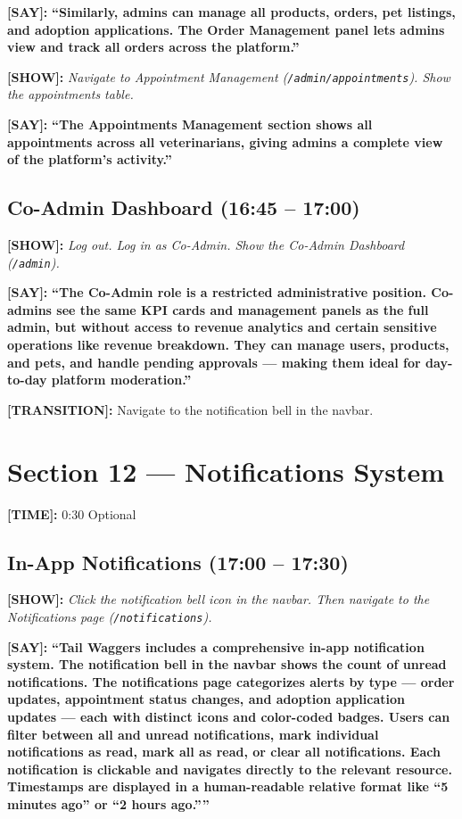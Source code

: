 \documentclass[12pt,a4paper]{article}
\newcommand{\say}[1]{\textbf{\textcolor{narration}{[SAY]:}} \textbf{``#1''}}
\newcommand{\show}[1]{\textbf{\textcolor{screen}{[SHOW]:}} \textit{#1}}
\newcommand{\timing}[1]{\textbf{\textcolor{timing}{[TIME]:}} #1}
\newcommand{\trans}[1]{\textbf{\textcolor{transition}{[TRANSITION]:}} #1}
\begin{document}
\say{Similarly, admins can manage all products, orders, pet listings, and adoption applications. The Order Management panel lets admins view and track all orders across the platform.}

\show{Navigate to Appointment Management (\texttt{/admin/appointments}). Show the appointments table.}

\say{The Appointments Management section shows all appointments across all veterinarians, giving admins a complete view of the platform's activity.}

\subsection{Co-Admin Dashboard (16:45 -- 17:00)}

\show{Log out. Log in as Co-Admin. Show the Co-Admin Dashboard (\texttt{/admin}).}

\say{The Co-Admin role is a restricted administrative position. Co-admins see the same KPI cards and management panels as the full admin, but without access to revenue analytics and certain sensitive operations like revenue breakdown. They can manage users, products, and pets, and handle pending approvals --- making them ideal for day-to-day platform moderation.}

\trans{Navigate to the notification bell in the navbar.}

\newpage

\section{Section 12 --- Notifications System}
\label{sec:notifications}

\timing{0:30} \hfill Optional

\subsection{In-App Notifications (17:00 -- 17:30)}

\show{Click the notification bell icon in the navbar. Then navigate to the Notifications page (\texttt{/notifications}).}

\say{Tail Waggers includes a comprehensive in-app notification system. The notification bell in the navbar shows the count of unread notifications. The notifications page categorizes alerts by type --- order updates, appointment status changes, and adoption application updates --- each with distinct icons and color-coded badges. Users can filter between all and unread notifications, mark individual notifications as read, mark all as read, or clear all notifications. Each notification is clickable and navigates directly to the relevant resource. Timestamps are displayed in a human-readable relative format like ``5 minutes ago'' or ``2 hours ago.''}
\end{document}
